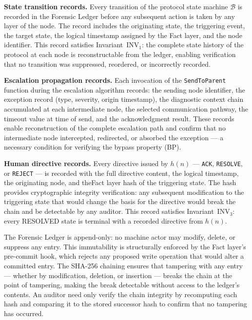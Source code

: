 \textbf{State transition records.} Every transition of the protocol state machine
$\mathcal{B}$ is recorded in the Forensic Ledger before any subsequent action
is taken by any layer of the node.  The record includes the originating state,
the triggering event, the target state, the logical timestamp assigned by the
Fact layer, and the node identifier.  This record satisfies Invariant~INV$_1$:
the complete state history of the protocol at each node is reconstructable from
the ledger, enabling verification that no transition was suppressed, reordered,
or incorrectly recorded.

\textbf{Escalation propagation records.} Each invocation of the \texttt{SendToParent}
function during the escalation algorithm records: the sending node identifier,
the exception record (type, severity, origin timestamp), the diagnostic context
chain accumulated at each intermediate node, the selected communication pathway,
the timeout value at time of send, and the acknowledgment result.  These
records enable reconstruction of the complete escalation path and confirm that
no intermediate node intercepted, redirected, or absorbed the exception — a
necessary condition for verifying the bypass property (BP).

\textbf{Human directive records.} Every directive issued by $h(n)$ — \texttt{ACK},
\texttt{RESOLVE}, or \texttt{REJECT} — is recorded with the full directive content,
the logical timestamp, the originating node, and theFact layer hash of the
triggering state.  The hash provides cryptographic integrity verification: any
subsequent modification to the triggering state that would change the basis for
the directive would break the chain and be detectable by any auditor.  This
record satisfies Invariant~INV$_3$: every RESOLVED state is terminal with a
recorded directive from $h(n)$.

The Forensic Ledger is append-only: no machine actor may modify, delete, or
suppress any entry.  This immutability is structurally enforced by the Fact
layer's pre-commit hook, which rejects any proposed write operation that would
alter a committed entry.  The SHA-256 chaining ensures that tampering with any
entry — whether by modification, deletion, or insertion — breaks the chain at
the point of tampering, making the break detectable without access to the
ledger's contents.  An auditor need only verify the chain integrity by
recomputing each hash and comparing it to the stored successor hash to confirm
that no tampering has occurred.

